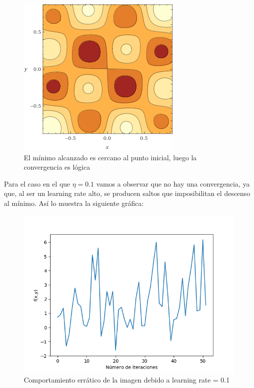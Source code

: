 \begin{figure}[H] %
	\centering
	\includegraphics[scale=0.6]{f2.png}  %
	\caption{El mínimo alcanzado es cercano al punto inicial, luego la convergencia es lógica} 
	\label{fig:f2}
\end{figure}


Para el caso en el que $\eta=0.1$ vamos a observar que no hay una convergencia, ya que, al ser un learning rate alto, se producen saltos que imposibilitan el descenso al mínimo. Así lo muestra la siguiente gráfica:

\begin{figure}[H] %
	\centering
	\includegraphics[scale=0.6]{f3.png}  %
	\caption{Comportamiento errático de la imagen debido a learning rate = 0.1} 
	\label{fig:f3}
\end{figure}

